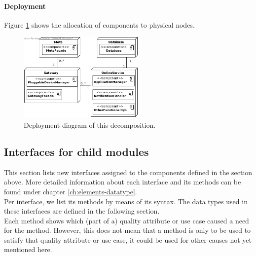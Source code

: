 
    \paragraph{Deployment}
        Figure \ref{fig:it1-depl_main} shows the allocation of components
        to physical nodes.

        \begin{figure}[!htp]
        	\centering
        	\includegraphics[width=0.55\textwidth]{images/deployment-diagram-1}
        	\caption{Deployment diagram of this decomposition.}\label{fig:it1-depl_main}
        \end{figure}


\subsection{Interfaces for child modules}\label{add1-interfaces}
    This section lists new interfaces assigned to the components defined
    in the section above. More detailed information about each interface and
    its methods can be found under chapter \ref{ch:elements-datatype}. \\
     Per interface, we list its methods by means of its
    syntax. The data types used in these interfaces are defined in the following section. \\

    Each method shows which (part of a) quality attribute or use case caused
    a need for the method. However, this does not mean that a method is
    only to be used to satisfy that quality attribute or use case, it could
    be used for other causes not yet mentioned here.

